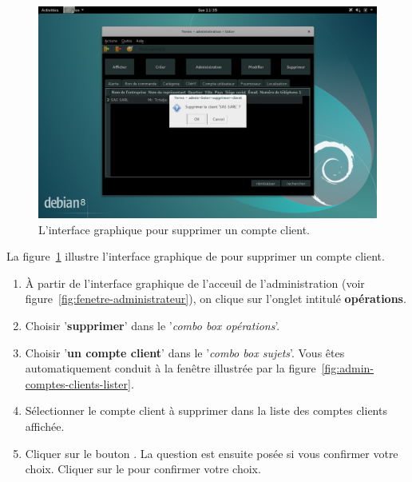 
\newpage
{}

\begin{figure}[!htpb]
	\centering
	\includegraphics[scale=0.39]{images/compte-client-supprimer.png}
	\caption{L'interface graphique pour supprimer un compte client.}
	\label{fig:admin-comptes-clients-supprimer}
\end{figure}

La figure~\ref{fig:admin-comptes-clients-supprimer} illustre
l'interface graphique de \yeren pour supprimer un compte
client.

\begin{enumerate}[1)]
	\item \`A partir de l'interface graphique de l'acceuil de
		l'administration (voir figure~\ref{fig:fenetre-administrateur}),
		on clique sur l'onglet intitul\'e \textbf{op\'erations}. 
		
	\item Choisir '\textbf{supprimer}' dans le '\emph{combo box
		op\'erations}'.
		
	\item Choisir '\textbf{un compte client}' dans le '\emph{combo box
		sujets}'. Vous \^etes automatiquement conduit \`a la fen\^etre
		illustr\'ee par la figure~\ref{fig:admin-comptes-clients-lister}.
		
	\item S\'electionner le compte client \`a supprimer dans la liste
		des comptes clients affich\'ee.
		
	\item Cliquer sur le bouton . La question
		est ensuite pos\'ee si vous confirmer votre choix.
		Cliquer sur le  pour confirmer votre choix.
\end{enumerate}
